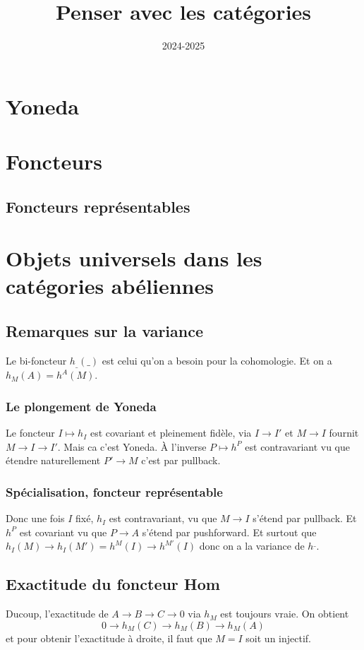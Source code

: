 \documentclass[a4paper,12pt]{book}
\title{Penser avec les catégories}
\date{2024-2025}
\theoremstyle{plain}
\theoremstyle{definition}
\theoremstyle{remark}
\begin{document}
\maketitle
\tableofcontents

\chapter{Yoneda}


\chapter{Foncteurs}

\section{Foncteurs représentables}

\chapter{Objets universels dans les catégories abéliennes}

\section{Remarques sur la variance}
Le bi-foncteur $h_{\_}(\_)$ est celui qu'on a besoin pour
la cohomologie. Et on a $h_M(A)=h^A(M)$.
\subsection{Le plongement de Yoneda}
Le foncteur $I\mapsto h_I$ est covariant et pleinement fidèle,
via $I\to I'$ et $M\to I$ fournit $M\to I\to I'$. Mais ca c'est Yoneda.
À l'inverse $P\mapsto h^P$ est contravariant vu que étendre 
naturellement $P'\to M$ c'est par pullback. 

\subsection{Spécialisation, foncteur représentable}
Donc une fois $I$ fixé, $h_I$ est contravariant, vu que
$M\to I$ s'étend par pullback. Et $h^P$ est covariant
vu que $P\to A$ s'étend par pushforward. Et surtout que 
$h_I(M)\to h_I(M')=h^M(I)\to h^{M'}(I)$ donc on a la variance
de $h^{\_}$.

\section{Exactitude du foncteur Hom}
Ducoup, l'exactitude de $A\to B\to C\to 0$
via $h_M$ est toujours vraie. On obtient
\[0\to h_M(C)\to h_M(B)\to h_M(A)\]
et pour obtenir l'exactitude à droite, il
faut que $M=I$ soit un injectif.
\end{document}
